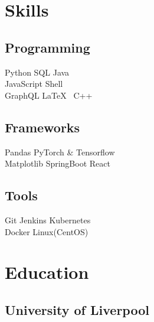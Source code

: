 \documentclass[]{CV}
\begin{document}
\hfill
\begin{minipage}[t]{0.25\textwidth} 


\section{Skills}
\subsection{Programming}
\sectionsep
{}
Python \textbullet{} SQL \textbullet{} Java \\
\sectionsep
{}
JavaScript \textbullet{} Shell \\
\sectionsep
{}
GraphQL \textbullet{}  \LaTeX\ \textbullet{} C++ \\
\sectionsep
\sectionsep
\subsection{Frameworks}
\sectionsep
Pandas \textbullet{} PyTorch \& Tensorflow \\  Matplotlib \textbullet{} SpringBoot \textbullet{} React \\
\sectionsep
\sectionsep
\subsection{Tools}
\sectionsep
Git \textbullet{} Jenkins \textbullet{} Kubernetes  \\ Docker \textbullet{} Linux(CentOS) \\

\sectionsep


\section{Education} 
\subsection{University of Liverpool}

\sectionsep

\end{minipage}
\end{document}
